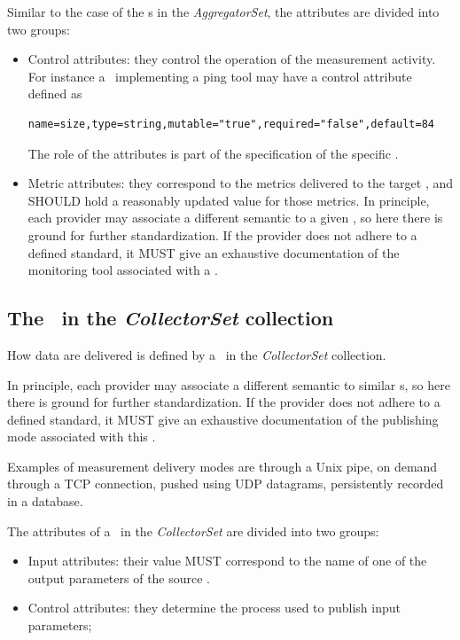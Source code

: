 \documentclass[12pt]{article}  %
\begin{document}
{Similar to the case of the \mi s in the {\em AggregatorSet}, the attributes are divided into two groups:
\begin{itemize}
\item Control attributes: they control the operation of the measurement activity. For instance a \mi\ implementing a ping tool may have a control attribute defined as 
\begin{verbatim}
name=size,type=string,mutable="true",required="false",default=84
\end{verbatim}
The role of the attributes is part of the specification of the specific \mi.
\item Metric attributes: they correspond to the metrics delivered to the target \sens, and SHOULD hold a reasonably updated value for those metrics. In principle, each provider may associate a different semantic to a given \mi, so here there is ground for further standardization. If the provider does not adhere to a defined standard, it MUST give an exhaustive documentation of the monitoring tool associated with a \mi.
\end{itemize}

\subsection{The \mi\ in the {\em CollectorSet} collection}

How data are delivered is defined by a \mi\ in the {\em CollectorSet} collection.

In principle, each provider may associate a different semantic to similar \mi s, so here there is ground for further standardization. If the provider does not adhere to a defined standard, it MUST give an exhaustive documentation of the publishing mode associated with this \mi.

Examples of measurement delivery modes are through a Unix pipe, on demand through a TCP connection, pushed using UDP datagrams, persistently recorded in a database.

The attributes of a \mi\ in the {\em CollectorSet} are divided into two groups:

\begin{itemize}
\item Input attributes: their value MUST correspond to the name of one of the output parameters of the source \sens .
\item Control attributes: they determine the process used to publish input parameters;
\end{itemize}

}
\end{document}
